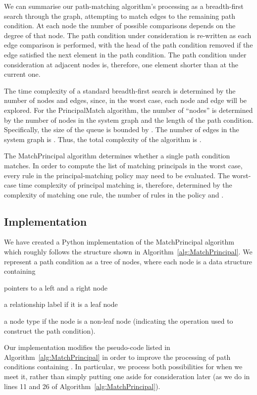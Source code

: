 \documentclass{article}
\begin{document}
We can summarise our path-matching algorithm's processing as a breadth-first search through the graph, attempting to match edges to the remaining path condition.
At each node the number of possible comparisons depends on the degree of that node.
The path condition under consideration is re-written as each edge comparison is performed, with the head of the path condition removed if the edge satisfied the next element in the path condition.
The path condition under consideration at adjacent nodes is, therefore, one element shorter than at the current one.

The time complexity of a standard breadth-first search is determined by the number of nodes and edges, since, in the worst case, each node and edge will be explored.
For the \textsf{PrincipalMatch} algorithm, the number of ``nodes'' is determined by the number of nodes in the system graph and the length of the path condition.
Specifically, the size of the queue is bounded by .
The number of edges in the system graph is .
Thus, the total complexity of the algorithm is .

The \textsf{MatchPrincipal} algorithm determines whether a single path condition matches.
In order to compute the list of matching principals in the worst case, every rule in the principal-matching policy  may need to be evaluated.
The worst-case time complexity of principal matching is, therefore, determined by the complexity of matching one rule, the number of rules in the policy and .

\subsection{Implementation}
We have created a Python implementation of the \textsf{MatchPrincipal} algorithm which roughly follows the structure shown in Algorithm~\ref{alg:MatchPrincipal}.
We represent a path condition as a tree of nodes, where each node is a data structure containing
\begin{inparaenum}[(i)]
  \item pointers to a left and a right node
  \item a relationship label if it is a leaf node
  \item a node type if the node is a non-leaf node (indicating the operation used to construct the path condition).
\end{inparaenum}
Our implementation modifies the pseudo-code listed in Algorithm~\ref{alg:MatchPrincipal} in order to improve the processing of path conditions containing .
In particular, we process both possibilities for  when we meet it, rather than simply putting one aside for consideration later (as we do in lines 11 and 26 of Algorithm~\ref{alg:MatchPrincipal}).
\end{document}
